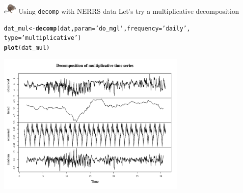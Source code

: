 \documentclass[xcolor=dvipsnames,serif]{beamer}\usepackage[]{graphicx}\usepackage[]{color}
\makeatletter
\newcommand{\hlstr}[1]{\textcolor[rgb]{0.192,0.494,0.8}{#1}}%
\newcommand{\hlstd}[1]{\textcolor[rgb]{0.345,0.345,0.345}{#1}}%
\newcommand{\hlkwb}[1]{\textcolor[rgb]{0.69,0.353,0.396}{#1}}%
\newcommand{\hlkwc}[1]{\textcolor[rgb]{0.333,0.667,0.333}{#1}}%
\newcommand{\hlkwd}[1]{\textcolor[rgb]{0.737,0.353,0.396}{\textbf{#1}}}%
\newenvironment{kframe}{%
 \def\at@end@of@kframe{}%
 \ifinner\ifhmode%
  \def\at@end@of@kframe{\end{minipage}}%
  \begin{minipage}{\columnwidth}%
 \fi\fi%
 \def\FrameCommand##1{\hskip\@totalleftmargin \hskip-\fboxsep
 \colorbox{shadecolor}{##1}\hskip-\fboxsep
     \hskip-\linewidth \hskip-\@totalleftmargin \hskip\columnwidth}%
 \MakeFramed {\advance\hsize-\width
   \@totalleftmargin\z@ \linewidth\hsize
   \@setminipage}}%
 {\par\unskip\endMakeFramed%
 \at@end@of@kframe}
\newenvironment{knitrout}{}{} %
\makeatother
\begin{document}
\begin{frame}[fragile]{\includegraphics[width = 0.05\textwidth]{imgs/swmprat.png} Using \texttt{decomp} with NERRS data}
Let's try a multiplicative decomposition
\begin{knitrout}\scriptsize
{}\color{fgcolor}\begin{kframe}
\begin{alltt}
\hlstd{dat_mul} \hlkwb{<-} \hlkwd{decomp}\hlstd{(dat,} \hlkwc{param} \hlstd{=} \hlstr{'do_mgl'}\hlstd{,} \hlkwc{frequency} \hlstd{=} \hlstr{'daily'}\hlstd{,}
  \hlkwc{type} \hlstd{=} \hlstr{'multiplicative'}\hlstd{)}
\hlkwd{plot}\hlstd{(dat_mul)}
\end{alltt}
\end{kframe}

{\centering \includegraphics[width=0.7\textwidth]{imgs/dailydcmul-1} 

}



\end{knitrout}
\end{frame}
\end{document}
